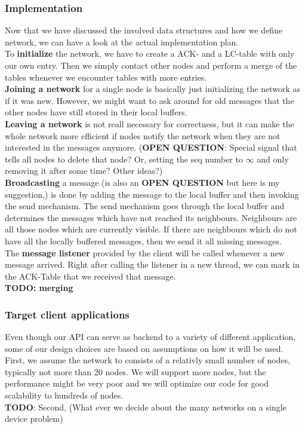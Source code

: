 	\subsubsection{Implementation}
Now that we have discussed the involved data structures and how we define network, we can have a look at the actual implementation plan. \\
To \textbf{initialize} the network, we have to create a ACK- and a LC-table with only our own entry. Then we simply contact other nodes and perform a merge of the tables whenever we encounter tables with more entries. \\
\textbf{Joining a network} for a single node is basically just initializing the network as if it was new. However, we might want to ask around for old messages that the other nodes have still stored in their local buffers. \\ 
\textbf{Leaving a network} is not reall necessary for correctness, but it can make the whole network more efficient if nodes notify the network when they are not interested in the messages anymore. (\textbf{OPEN QUESTION}: Special signal that tells all nodes to delete that node? Or, setting the seq number to $\infty$ and only removing it after some time? Other ideas?)\\
\textbf{Broadcasting} a message (is also an \textbf{OPEN QUESTION} but here is my suggestion,) is done by adding the message to the local buffer and then invoking the send mechanism. The send mechanism goes through the local buffer and determines the messages which have not reached its neighbours. Neighbours are all those nodes which are currently visible. If there are neighbours which do not have all the locally buffered messages, then we send it all missing messages.\\
The \textbf{message listener} provided by the client will be called whenever a new message arrived. Right after calling the listener in a new thread, we can mark in the ACK-Table that we received that message.  \\
\textbf{TODO: merging}

\subsubsection{Target client applications}
	Even though our API can serve as backend to a variety of different application, some of our design choices are based on assumptions on how it will be used. \\
	First, we assume the network to consists of a relativly small number of nodes, typically not more than 20 nodes. We will support more nodes, but the performance might be very poor and we will optimize our code for good scalability to hundreds of nodes. \\
	\textbf{TODO}: Second, (What ever we decide about the many networks on a single device problem)
		
